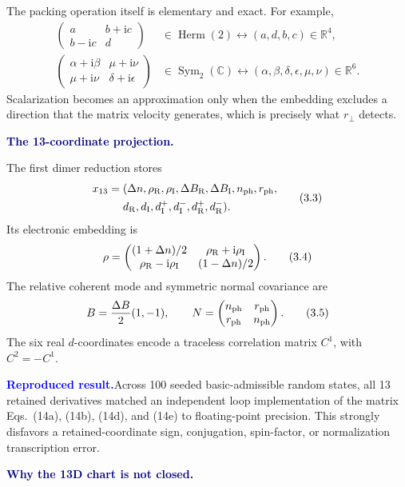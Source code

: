 \documentclass[10pt]{article}
\newcommand{\ii}{\mathrm i}
\newcommand{\Herm}{\operatorname{Herm}}
\newcommand{\Sym}{\operatorname{Sym}}
\newcommand{\C}{\mathbb C}
\newcommand{\R}{\mathbb R}
\newcommand{\evidencebox}[1]{%
  \par\medskip
  \noindent\colorbox{paleblue}{%
    \parbox{\dimexpr\linewidth-2\fboxsep\relax}{%
      \textcolor{blue}{\textbf{Reproduced result.}}\quad #1%
    }%
  }\par\medskip
}
\newcommand{\flowlead}[1]{%
  \par\medskip
  \needspace{3\baselineskip}%
  \noindent\textcolor{navy}{\textbf{#1.}}\enspace\ignorespaces
}
\begin{document}
The packing operation itself is elementary and exact.  For example,
\[
\begin{aligned}
\begin{pmatrix}a&b+\ii c\\b-\ii c&d\end{pmatrix}
&\in\Herm(2)
\longleftrightarrow (a,d,b,c)\in\R^4,\\
\begin{pmatrix}
\alpha+\ii\beta&\mu+\ii\nu\\
\mu+\ii\nu&\delta+\ii\epsilon
\end{pmatrix}
&\in\Sym_2(\C)
\longleftrightarrow
(\alpha,\beta,\delta,\epsilon,\mu,\nu)\in\R^6.
\end{aligned}
\tag{3.2}
\]
Scalarization becomes an approximation only when the embedding excludes a
direction that the matrix velocity generates, which is precisely what
\(r_\perp\) detects.

\flowlead{The 13-coordinate projection}

The first dimer reduction stores
\[
\begin{aligned}
x_{13}={}&(\Delta n,\rho_{\rm R},\rho_{\rm I},
\Delta B_{\rm R},\Delta B_{\rm I},n_{\rm ph},r_{\rm ph},\\
&d_{\rm R},d_{\rm I},
d_{\rm I}^{+},d_{\rm I}^{-},
d_{\rm R}^{+},d_{\rm R}^{-}).
\end{aligned}
\tag{3.3}
\]
Its electronic embedding is
\[
\rho=
\begin{pmatrix}
(1+\Delta n)/2&\rho_{\rm R}+\ii\rho_{\rm I}\\
\rho_{\rm R}-\ii\rho_{\rm I}&(1-\Delta n)/2
\end{pmatrix}.
\tag{3.4}
\]
The relative coherent mode and symmetric normal covariance are
\[
B=\frac{\Delta B}{2}(1,-1),\qquad
N=
\begin{pmatrix}
n_{\rm ph}&r_{\rm ph}\\
r_{\rm ph}&n_{\rm ph}
\end{pmatrix}.
\tag{3.5}
\]
The six real \(d\)-coordinates encode a traceless correlation matrix
\(C^1\), with \(C^2=-C^1\).

\evidencebox{Across 100 seeded basic-admissible random states, all 13 retained
derivatives matched an independent loop implementation of the matrix
Eqs.~(14a), (14b), (14d), and (14e) to floating-point precision.  This
strongly disfavors a retained-coordinate sign, conjugation, spin-factor, or
normalization transcription error.}

\flowlead{Why the 13D chart is not closed}
\end{document}

